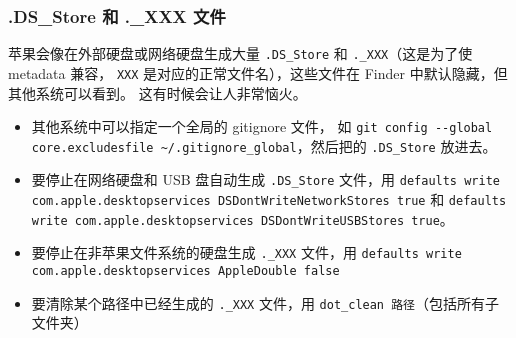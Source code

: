 \subsubsection{.DS_Store 和 ._XXX 文件}
苹果会像在外部硬盘或网络硬盘生成大量 \verb`.DS_Store` 和 \verb`._XXX`（这是为了使 metadata 兼容， \verb`XXX` 是对应的正常文件名），这些文件在 Finder 中默认隐藏，但其他系统可以看到。 这有时候会让人非常恼火。
\begin{itemize}
\item 其他系统中可以指定一个全局的 gitignore 文件， 如 \verb`git config --global core.excludesfile ~/.gitignore_global`，然后把的 \verb`.DS_Store` 放进去。
\item 要停止在网络硬盘和 USB 盘自动生成 \verb`.DS_Store` 文件，用 \verb`defaults write com.apple.desktopservices DSDontWriteNetworkStores true` 和 \verb`defaults write com.apple.desktopservices DSDontWriteUSBStores true`。
\item 要停止在非苹果文件系统的硬盘生成 \verb`._XXX` 文件，用 \verb`defaults write com.apple.desktopservices AppleDouble false`
\item 要清除某个路径中已经生成的 \verb`._XXX` 文件，用 \verb`dot_clean 路径`（包括所有子文件夹）
\end{itemize}

